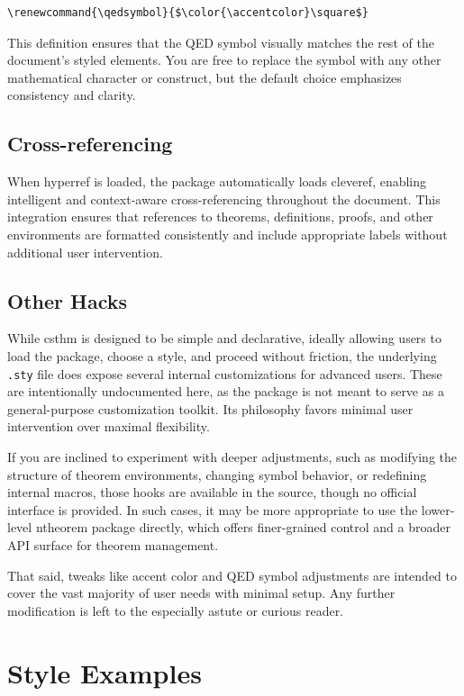 \documentclass[10pt,letterpaper]{amsart}
\begin{document}
\begin{verbatim}
\renewcommand{\qedsymbol}{$\color{\accentcolor}\square$}
\end{verbatim}

This definition ensures that the QED symbol visually matches the rest of the
document's styled elements. You are free to replace the symbol with any other
mathematical character or construct, but the default choice emphasizes
consistency and clarity.

\subsection{Cross-referencing}

When \textsf{hyperref} is loaded, the package automatically loads
\textsf{cleveref}, enabling intelligent and context-aware cross-referencing
throughout the document. This integration ensures that references to theorems,
definitions, proofs, and other environments are formatted consistently and
include appropriate labels without additional user intervention.

\subsection{Other Hacks}

While \textsf{csthm} is designed to be simple and declarative, ideally allowing
users to load the package, choose a style, and proceed without friction, the
underlying \texttt{.sty} file does expose several internal customizations for
advanced users. These are intentionally undocumented here, as the package is
not meant to serve as a general-purpose customization toolkit. Its philosophy
favors minimal user intervention over maximal flexibility.

If you are inclined to experiment with deeper adjustments, such as modifying
the structure of theorem environments, changing symbol behavior, or redefining
internal macros, those hooks are available in the source, though no official
interface is provided. In such cases, it may be more appropriate to use
the lower-level \textsf{ntheorem} package directly, which offers finer-grained control and a broader API
surface for theorem management.

That said, tweaks like accent color and QED symbol adjustments are intended to
cover the vast majority of user needs with minimal setup. Any further
modification is left to the especially astute or curious reader.

\section{Style Examples}
\end{document}
